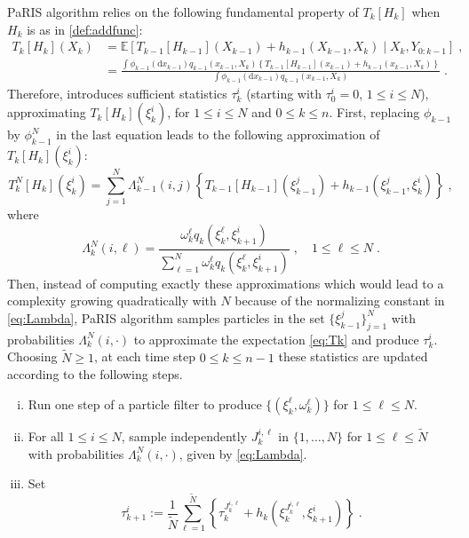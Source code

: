 \documentclass[12pt,draft]{article}
\newcommand{\rmd}{\mathrm{d}}
\newcommand{\eqsp}{\;}
\newcommand{\1}{\mathrm{1}}
\newcommand{\qk}{q_{k}}
\begin{document}
PaRIS algorithm relies on the following fundamental property of $T_k[H_k]$ when $H_k$ is as in \eqref{def:addfunc}:
\begin{align*}
T_k[H_k](X_k) &=\mathbb{E}\left[T_{k-1}[H_{k-1}](X_{k-1}) + h_{k-1}(X_{k-1},X_k)\middle|X_k,Y_{0:k-1} \right]\eqsp,\\
&= \frac{\int \phi_{k-1}(\rmd x_{k-1})q_{k-1}(x_{k-1},X_k)\left\{T_{k-1}[H_{k-1}](x_{k-1}) + h_{k-1}(x_{k-1},X_k)\right\}}{\int \phi_{k-1}(\rmd x_{k-1})q_{k-1}(x_{k-1},X_k)}\eqsp.
\end{align*}
Therefore, \cite{olsson:westerborn:2016} introduces sufficient statistics $\tau^i_k$ (starting with $\tau^i_0 = 0$, $1\le i\le N$), approximating $T_k[H_k](\xi^i_k)$, for $1\le i\le N$ and $0\le k \le n$. First, replacing $\phi_{k-1}$ by $\phi^N_{k-1}$ in the last equation leads to the following approximation of $T_k[H_k](\xi^i_k)$:
\begin{equation}
\label{eq:Tk}
T_k^N[H_k](\xi_k^i) = \sum_{j=1}^N \Lambda_{k-1}^N(i,j)\left\{T_{k-1}[H_{k-1}](\xi_{k-1}^j) + h_{k-1}(\xi^j_{k-1},\xi^i_k)\right\}\eqsp, 
\end{equation}
where
\begin{equation}
\label{eq:Lambda}
\Lambda_{k}^N(i,\ell) = \frac{\omega^{\ell}_{k} \qk(\xi^{\ell}_{k},\xi_{k+1}^{i})}{\sum_{\ell=1}^N\omega^{\ell}_{k} \qk(\xi^{\ell}_{k},\xi_{k+1}^{i})}\eqsp,\quad 1\le \ell\le N\eqsp.
\end{equation}
Then, instead of computing exactly these approximations which would lead to a complexity growing quadratically with $N$ because of the normalizing constant in \eqref{eq:Lambda}, PaRIS algorithm samples particles in the set $\{\xi^j_{k-1}\}_{j=1}^N$ with probabilities $\Lambda_{k}^N(i,\cdot)$ to approximate the expectation \eqref{eq:Tk} and produce $\tau^i_k$.
Choosing $\tilde{N}\ge 1$, at each time step $0\le k \le {n-1}$ these statistics are updated according to the following steps.
\begin{enumerate}[(i)]
\item \label{it:PaRIS:filt} Run one step of a particle filter to produce $\{(\xi^{\ell}_k, \omega^{\ell}_k)\}$ for $1\le \ell \le N$.
\item \label{it:PaRIS:sampleindex} For all $1\le i \le N$, sample independently $J_{k}^{i,\ell}$ in $\{1,\ldots,N\}$ for $1\le \ell \le \widetilde N$ with probabilities $\Lambda_{k}^N(i,\cdot)$, given by \eqref{eq:Lambda}.
\item \label{it:PaRIS:smooth} Set
\[
\tau^{i}_{k+1} := \frac{1}{\widetilde{N}} \sum^{\widetilde{N}}_{\ell=1} \left\{ \tau^{J_{k}^{i,\ell}}_{k} + h_{k} \left(\xi^{J_{k}^{i,\ell}}_{k}, \xi^{i}_{k+1}\right)  \right\}\eqsp.
\]
\end{enumerate}
\end{document}
